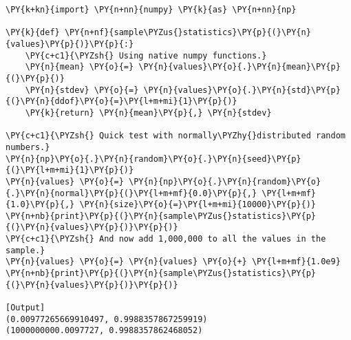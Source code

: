 \begin{Verbatim}[label=\makebox{\href{https://bitbucket.org/lbaldini/statnotes/src/master/snippets/sample\_stat4.py}{https://bitbucket.org/.../sample\_stat4.py}},commandchars=\\\{\}]
\PY{k+kn}{import} \PY{n+nn}{numpy} \PY{k}{as} \PY{n+nn}{np}

\PY{k}{def} \PY{n+nf}{sample\PYZus{}statistics}\PY{p}{(}\PY{n}{values}\PY{p}{)}\PY{p}{:}
    \PY{c+c1}{\PYZsh{} Using native numpy functions.}
    \PY{n}{mean} \PY{o}{=} \PY{n}{values}\PY{o}{.}\PY{n}{mean}\PY{p}{(}\PY{p}{)}
    \PY{n}{stdev} \PY{o}{=} \PY{n}{values}\PY{o}{.}\PY{n}{std}\PY{p}{(}\PY{n}{ddof}\PY{o}{=}\PY{l+m+mi}{1}\PY{p}{)}
    \PY{k}{return} \PY{n}{mean}\PY{p}{,} \PY{n}{stdev}

\PY{c+c1}{\PYZsh{} Quick test with normally\PYZhy{}distributed random numbers.}
\PY{n}{np}\PY{o}{.}\PY{n}{random}\PY{o}{.}\PY{n}{seed}\PY{p}{(}\PY{l+m+mi}{1}\PY{p}{)}
\PY{n}{values} \PY{o}{=} \PY{n}{np}\PY{o}{.}\PY{n}{random}\PY{o}{.}\PY{n}{normal}\PY{p}{(}\PY{l+m+mf}{0.0}\PY{p}{,} \PY{l+m+mf}{1.0}\PY{p}{,} \PY{n}{size}\PY{o}{=}\PY{l+m+mi}{10000}\PY{p}{)}
\PY{n+nb}{print}\PY{p}{(}\PY{n}{sample\PYZus{}statistics}\PY{p}{(}\PY{n}{values}\PY{p}{)}\PY{p}{)}
\PY{c+c1}{\PYZsh{} And now add 1,000,000 to all the values in the sample.}
\PY{n}{values} \PY{o}{=} \PY{n}{values} \PY{o}{+} \PY{l+m+mf}{1.0e9}
\PY{n+nb}{print}\PY{p}{(}\PY{n}{sample\PYZus{}statistics}\PY{p}{(}\PY{n}{values}\PY{p}{)}\PY{p}{)}

[Output]
(0.00977265669910497, 0.9988357867259919)
(1000000000.0097727, 0.9988357862468052)
\end{Verbatim}